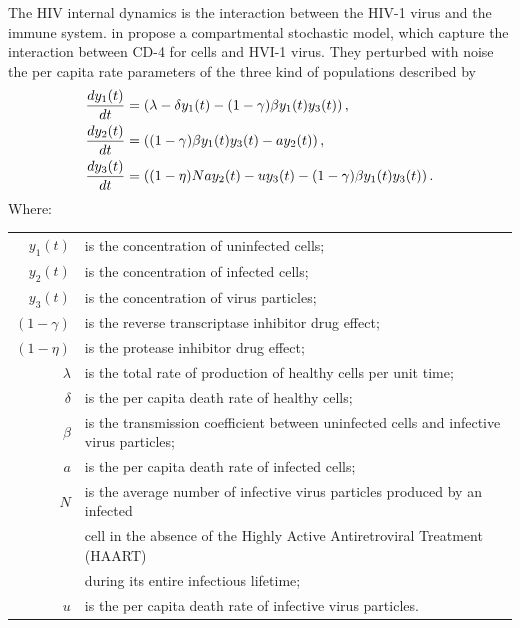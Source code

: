 
	The HIV internal dynamics is the interaction between the HIV-1 virus and the immune system. 
\citeauthor*{Dalal2008} in \cite{Dalal2008} propose a compartmental stochastic model, which capture the interaction 
between CD-4 for cells and HVI-1 virus. They perturbed  with noise the per capita rate parameters of the three kind of 
populations described by
\begin{align}\label{eqn:HIVDynamics}
	\frac{dy_1(t)}{dt} &=
		\left(
			\lambda -\delta y_1(t) - (1 - \gamma) \beta y_1(t) y_3(t)
		\right),
		\notag \\
	\frac{dy_2(t)}{dt} &= 
		\left(
			(1- \gamma) \beta y_1(t) y_3(t) - a y_2(t) 
		\right),
	\\
	\frac{dy_3(t)}{dt} & = 
		\left(
			(1 - \eta) N a y_2(t) 
			-u y_3(t)
			-(1 - \gamma ) \beta y_1(t) y_3(t) 
		\right).
	\notag
\end{align}
Where:
\begin{table}[h!]
	\begin{center}
	\begin{tabular}{rl}
		$y_1(t)$ &				is the concentration of uninfected cells;\\ 
		$y_2(t)$ &				is the concentration of infected cells; \\
		$y_3(t)$ &				is the concentration of virus particles;\\
		$(1 - \gamma)$ &	is the reverse transcriptase inhibitor drug effect;\\
		$(1 -\eta)$ &			is the protease inhibitor drug effect; \\
		$\lambda$ &				is the total rate of production of healthy cells per unit time;\\
		$\delta$ &				is the per capita death rate of healthy cells;\\
		$\beta$ &					is the transmission coefficient between uninfected cells and infective virus particles;\\
		$a$ & 						is the per capita death rate of infected cells;\\
		$N$ &							is the average number of infective virus particles produced by an infected\\ 
				&							cell in the absence of the Highly Active Antiretroviral Treatment (HAART)\\
				&							during its entire infectious lifetime; \\
		$u$&							is the per capita death rate of infective virus particles.
	\end{tabular}
	\end{center}
\end{table}

